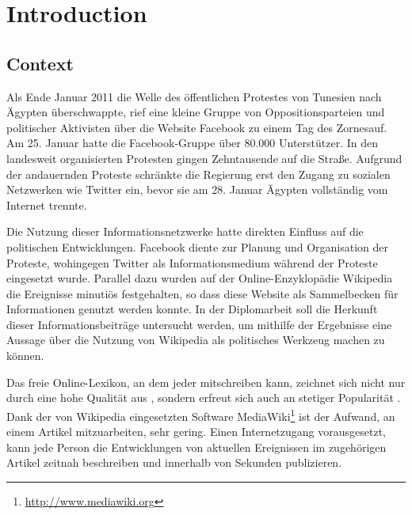 \chapter{Introduction}\label{ch:introduction}

\section{Context}


Als Ende Januar 2011 die Welle des öffentlichen Protestes von Tunesien nach Ägypten überschwappte, rief eine kleine Gruppe von Oppositionsparteien und politischer Aktivisten über die Website Facebook zu einem \glqq Tag des Zornes\grqq auf.
Am 25. Januar hatte die Facebook-Gruppe über 80.000 Unterstützer. 
In den landesweit organisierten Protesten gingen Zehntausende auf die Straße.
Aufgrund der andauernden Proteste schränkte die Regierung erst den Zugang zu sozialen Netzwerken wie Twitter ein, bevor sie am 28. Januar Ägypten vollständig vom Internet trennte.\cite{econ18013760, szegypt}

 
Die Nutzung dieser Informationsnetzwerke hatte direkten Einfluss auf die politischen Entwicklungen. 
Facebook diente zur Planung und Organisation der Proteste, wohingegen Twitter als Informationsmedium während der Proteste eingesetzt wurde. 
Parallel dazu wurden auf der Online-Enzyklopädie Wikipedia die Ereignisse minutiös festgehalten\cite{wikiegypt}, so dass diese Website als Sammelbecken für Informationen genutzt werden konnte. 
In der Diplomarbeit soll die Herkunft dieser Informationsbeiträge untersucht werden, um mithilfe der Ergebnisse eine Aussage über die Nutzung von Wikipedia als politisches Werkzeug machen zu können. 


Das freie Online-Lexikon, an dem jeder mitschreiben kann, zeichnet sich nicht nur durch eine hohe Qualität aus \cite{giles2005internet}, sondern erfreut sich auch an stetiger Popularität \cite{wikipv}. 
Dank der von Wikipedia eingesetzten Software MediaWiki\footnote{\url{http://www.mediawiki.org}} ist der Aufwand, an einem Artikel mitzuarbeiten, sehr gering.
Einen Internetzugang vorausgesetzt, kann jede Person die Entwicklungen von aktuellen Ereignissen im zugehörigen Artikel zeitnah beschreiben und innerhalb von Sekunden publizieren.

